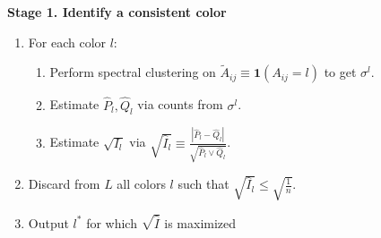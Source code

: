 \documentclass{article}
\begin{document}
\textbf{Stage 1. Identify a consistent color}
\begin{enumerate}
\item For each color $l$:
  \begin{enumerate}
   \item Perform spectral clustering on $\tilde{A}_{ij} \equiv \mathbf{1}(A_{ij} = l)$ to get $\sigma^l$.
   \item Estimate $\hat{P}_l, \hat{Q}_l$ via counts from $\sigma^l$. 
   \item Estimate $\sqrt{I_l}$ via 
  $\sqrt{ \hat{I}_l } \equiv \frac{| \hat{P}_l - \hat{Q}_l |}{\sqrt{ \hat{P}_l \vee \hat{Q}_l}}$. 
   \end{enumerate}
\item Discard from $L$ all colors $l$ such that $\sqrt{\hat{I}_l} \leq \sqrt{ \frac{1}{n}}$.
\item Output $l^*$ for which $\sqrt{\hat{I}}$ is maximized
\end{enumerate}
\end{document}
